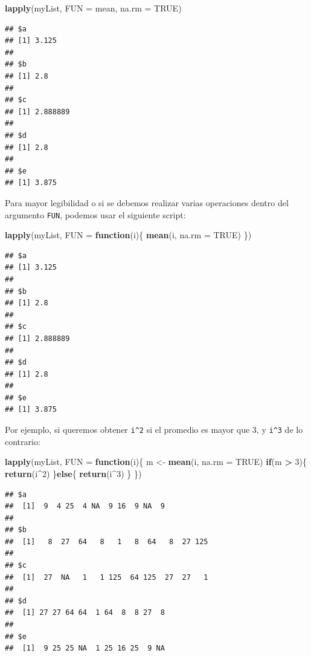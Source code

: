 \documentclass[
]{book}
\newenvironment{Shaded}{\begin{snugshade}}{\end{snugshade}}
\newcommand{\ControlFlowTok}[1]{\textcolor[rgb]{0.13,0.29,0.53}{\textbf{#1}}}
\newcommand{\DataTypeTok}[1]{\textcolor[rgb]{0.13,0.29,0.53}{#1}}
\newcommand{\DecValTok}[1]{\textcolor[rgb]{0.00,0.00,0.81}{#1}}
\newcommand{\KeywordTok}[1]{\textcolor[rgb]{0.13,0.29,0.53}{\textbf{#1}}}
\newcommand{\NormalTok}[1]{#1}
\newcommand{\OperatorTok}[1]{\textcolor[rgb]{0.81,0.36,0.00}{\textbf{#1}}}
\newcommand{\OtherTok}[1]{\textcolor[rgb]{0.56,0.35,0.01}{#1}}
\newcommand{\StringTok}[1]{\textcolor[rgb]{0.31,0.60,0.02}{#1}}
\begin{document}
\begin{Shaded}
\begin{Highlighting}[]
\KeywordTok{lapply}\NormalTok{(myList, }\DataTypeTok{FUN =}\NormalTok{ mean, }\DataTypeTok{na.rm =} \OtherTok{TRUE}\NormalTok{)}
\end{Highlighting}
\end{Shaded}

\begin{verbatim}
## $a
## [1] 3.125
## 
## $b
## [1] 2.8
## 
## $c
## [1] 2.888889
## 
## $d
## [1] 2.8
## 
## $e
## [1] 3.875
\end{verbatim}

Para mayor legibilidad o si se debemos realizar varias operaciones dentro del argumento \texttt{FUN}, podemos usar el siguiente script:

\begin{Shaded}
\begin{Highlighting}[]
\KeywordTok{lapply}\NormalTok{(myList, }\DataTypeTok{FUN =} \ControlFlowTok{function}\NormalTok{(i)\{}
  \KeywordTok{mean}\NormalTok{(i, }\DataTypeTok{na.rm =} \OtherTok{TRUE}\NormalTok{)}
\NormalTok{\})}
\end{Highlighting}
\end{Shaded}

\begin{verbatim}
## $a
## [1] 3.125
## 
## $b
## [1] 2.8
## 
## $c
## [1] 2.888889
## 
## $d
## [1] 2.8
## 
## $e
## [1] 3.875
\end{verbatim}

Por ejemplo, si queremos obtener \texttt{i\^{}2} si el promedio es mayor que 3, y \texttt{i\^{}3} de lo contrario:

\begin{Shaded}
\begin{Highlighting}[]
\KeywordTok{lapply}\NormalTok{(myList, }\DataTypeTok{FUN =} \ControlFlowTok{function}\NormalTok{(i)\{}
\NormalTok{  m <-}\StringTok{ }\KeywordTok{mean}\NormalTok{(i, }\DataTypeTok{na.rm =} \OtherTok{TRUE}\NormalTok{)}
  \ControlFlowTok{if}\NormalTok{(m }\OperatorTok{>}\StringTok{ }\DecValTok{3}\NormalTok{)\{}
    \KeywordTok{return}\NormalTok{(i}\OperatorTok{^}\DecValTok{2}\NormalTok{)  }
\NormalTok{  \}}\ControlFlowTok{else}\NormalTok{\{}
    \KeywordTok{return}\NormalTok{(i}\OperatorTok{^}\DecValTok{3}\NormalTok{)}
\NormalTok{  \}}
\NormalTok{\})}
\end{Highlighting}
\end{Shaded}

\begin{verbatim}
## $a
##  [1]  9  4 25  4 NA  9 16  9 NA  9
## 
## $b
##  [1]   8  27  64   8   1   8  64   8  27 125
## 
## $c
##  [1]  27  NA   1   1 125  64 125  27  27   1
## 
## $d
##  [1] 27 27 64 64  1 64  8  8 27  8
## 
## $e
##  [1]  9 25 25 NA  1 25 16 25  9 NA
\end{verbatim}
\end{document}
